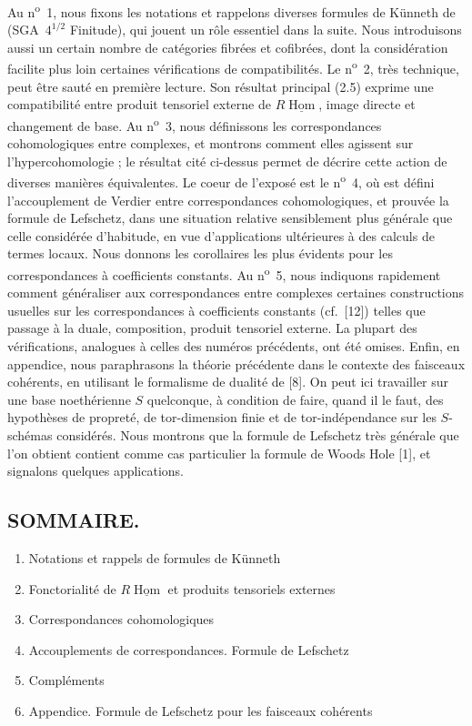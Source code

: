 \documentclass[11pt]{article}
\DeclareMathOperator{\Hom}{Hom}
\providecommand{\Hom}{\operatorname{Hom}}
\providecommand{\Hom}{\operatorname{Hom}}
\begin{document}
Au n\textsuperscript{o}~1, nous fixons les notations et rappelons diverses formules de Künneth de (SGA~$4^{1/2}$ Finitude), qui jouent un rôle essentiel dans la suite. Nous introduisons aussi un certain nombre de catégories fibrées et cofibrées, dont la considération facilite plus loin certaines vérifications de compatibilités. Le n\textsuperscript{o}~2, très technique, peut être sauté en première lecture. Son résultat principal (2.5) exprime une compatibilité entre produit tensoriel externe de $R\underline{\Hom}$, image directe et changement de base. Au n\textsuperscript{o}~3, nous définissons les correspondances cohomologiques entre complexes, et montrons comment elles agissent sur l'hypercohomologie ; le résultat cité ci-dessus permet de décrire cette action de diverses manières équivalentes. Le coeur de l'exposé est le n\textsuperscript{o}~4, où est défini l'accouplement de Verdier entre correspondances cohomologiques, et prouvée la formule de Lefschetz, dans une situation relative sensiblement plus générale que celle considérée d'habitude, en vue d'applications ultérieures à des calculs de termes locaux. Nous donnons les corollaires les plus évidents pour les correspondances à coefficients constants. Au n\textsuperscript{o}~5, nous indiquons rapidement comment généraliser aux correspondances entre complexes certaines constructions usuelles sur les correspondances à coefficients constants (cf.~[12]) telles que passage à la duale, composition, produit tensoriel externe. La plupart des vérifications, analogues à celles des numéros précédents, ont été omises. Enfin, en appendice, nous paraphrasons la théorie précédente dans le contexte des faisceaux cohérents, en utilisant le formalisme de dualité de [8]. On peut ici travailler sur une base noethérienne $S$ quelconque, à condition de faire, quand il le faut, des hypothèses de propreté, de tor-dimension finie et de tor-indépendance sur les $S$-schémas considérés. Nous montrons que la formule de Lefschetz très générale que l'on obtient contient comme cas particulier la formule de Woods Hole [1], et signalons quelques applications.

\subsection*{SOMMAIRE.}
\begin{enumerate}[label=\arabic*.]
\item
Notations et rappels de formules de Künneth
\item Fonctorialité de $R\underline{\Hom}$ et produits tensoriels externes
\item Correspondances cohomologiques
\item Accouplements de correspondances. Formule de Lefschetz
\item Compléments
\item Appendice. Formule de Lefschetz pour les faisceaux cohérents
\end{enumerate}
\end{document}
